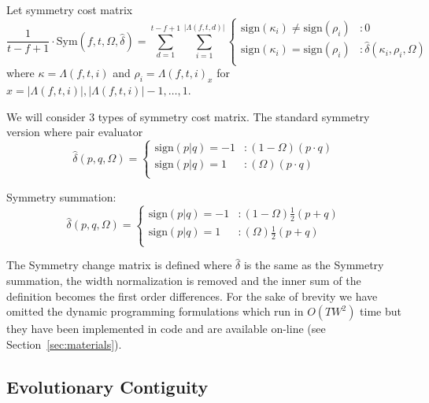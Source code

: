 \documentclass[twocolumn]{article}
\begin{document}
	Let symmetry cost matrix
	\begin{dmath*} \frac{1}{t-f+1} \cdot \mathrm{Sym}(f, t, \Omega, \hat \delta) =  
		\sum_{d=1}^{t-f+1} 
		\sum_{i=1}^{|\Lambda( f,t,d )|}{ \left\{
			\begin{array}{lr}
				\mathrm{sign}( \kappa_{i} ) \ne \mathrm{sign}( \rho_i )  & : 0   \\
				\mathrm{sign}( \kappa_{i} ) = \mathrm{sign}( \rho_i ) & : \hat \delta( \kappa_{i}, \rho_i, \Omega )  \\
			\end{array}
			\right.}
	\end{dmath*}  where  $\kappa=\Lambda( f,t,i )$ and $\rho_i = \Lambda( f,t,i )_x$ for $x=|\Lambda( f,t,i )|, |\Lambda( f,t,i )|-1,\ldots,1$.
	
	
	We will consider $3$ types of symmetry cost matrix. The standard symmetry version where pair evaluator 
		\begin{dmath*}\hat \delta( p,q, \Omega ) = \left\{
				\begin{array}{lr}
					\mathrm{sign}(p|q)=-1  & : (1-\Omega) ( p \cdot q ) \\
					\mathrm{sign}(p|q)= 1  & : (\Omega) ( p \cdot q )    \\
				\end{array}
				\right.
		\end{dmath*}
		
		Symmetry summation:
		\begin{dmath*}\hat \delta( p,q, \Omega ) = \left\{
			\begin{array}{lr}
				\mathrm{sign}(p|q)=-1  & : (1-\Omega) \frac{1}{2} ( p + q ) \\
				\mathrm{sign}(p|q)= 1  & : (\Omega) \frac{1}{2} ( p + q )    \\
			\end{array}
			\right.
	\end{dmath*}
	
	The Symmetry change matrix is defined where $\hat \delta$ is the same as the Symmetry summation, the width normalization is removed and the inner sum of the definition becomes the first order differences. For the sake of brevity we have omitted the dynamic programming formulations which run in $O(TW^2)$ time but they have been implemented in code and are available on-line (see Section~\ref{sec:materials}).
	
	\subsection{Evolutionary Contiguity}
	
\end{document}
